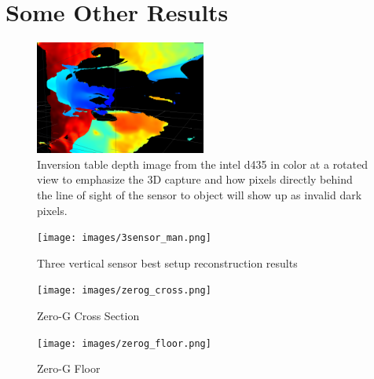 
\chapter{Some Other Results}

\begin{figure}[h]
        \caption{Inversion table depth image from the intel d435 in color at a rotated view to emphasize the 3D capture and how pixels directly behind the line of sight of the sensor to object will show up as invalid dark pixels.}
        \centering
        \includegraphics[width=0.5\textwidth]{images/inversion_depth.png}
\end{figure}

\begin{figure}[h]
        \caption{Three vertical sensor best setup reconstruction results}
        \centering
        \texttt{[image: images/3sensor\_man.png]}
\end{figure}


\begin{figure}[h]
        \caption{Zero-G Cross Section}
        \centering
        \texttt{[image: images/zerog\_cross.png]}
\end{figure}

\begin{figure}[h]
        \caption{Zero-G Floor}
        \centering
        \texttt{[image: images/zerog\_floor.png]}
\end{figure}


